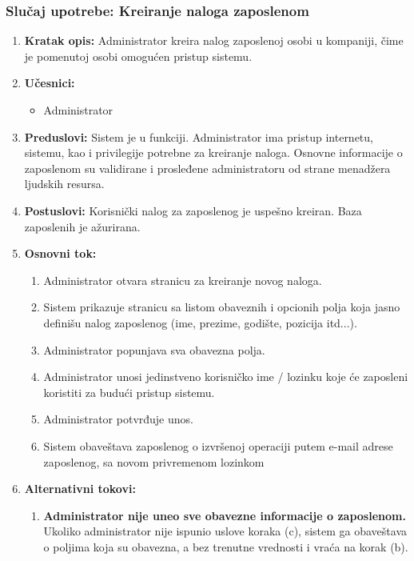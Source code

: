 \documentclass[a4paper]{article}
\begin{document}
\subsubsection{Slučaj upotrebe: Kreiranje naloga zaposlenom}
\begin{enumerate}
    \item \textbf{Kratak opis:} Administrator kreira nalog zaposlenoj osobi u kompaniji, čime je pomenutoj osobi omogućen pristup sistemu.
    \item \textbf{Učesnici:}
        \begin{itemize}
            \item Administrator
        \end{itemize}
    \item \textbf{Preduslovi:} Sistem je u funkciji. Administrator ima pristup internetu, sistemu, kao i privilegije potrebne za kreiranje naloga. Osnovne informacije o zaposlenom su validirane i prosleđene administratoru od strane menadžera ljudskih resursa.
    \item \textbf{Postuslovi:} Korisnički nalog za zaposlenog je uspešno kreiran. Baza zaposlenih je ažurirana.
    \item \textbf{Osnovni tok:}
        \begin{enumerate}
            \item Administrator otvara stranicu za kreiranje novog naloga.
            \item Sistem prikazuje stranicu sa listom obaveznih i opcionih polja koja jasno definišu nalog zaposlenog (ime, prezime, godište, pozicija itd...).
            \item Administrator popunjava sva obavezna polja.
            \item Administrator unosi jedinstveno korisničko ime / lozinku koje će zaposleni koristiti za budući pristup sistemu.
            \item Administrator potvrđuje unos.
            \item Sistem obaveštava zaposlenog o izvršenoj operaciji putem e-mail adrese zaposlenog, sa novom privremenom lozinkom
        \end{enumerate}
    \item \textbf{Alternativni tokovi:}
        \begin{enumerate}
            \item \textbf{Administrator nije uneo sve obavezne informacije o zaposlenom.} Ukoliko administrator nije ispunio uslove koraka (c), sistem ga obaveštava o poljima koja su obavezna, a bez trenutne vrednosti i vraća na korak (b).

\end{enumerate}
\end{enumerate}
\end{document}
